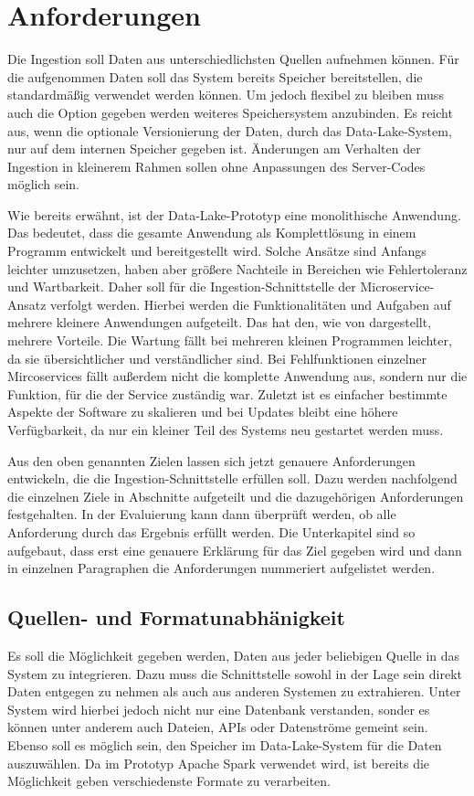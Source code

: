 \chapter{Anforderungen}

Die Ingestion soll Daten aus unterschiedlichsten Quellen aufnehmen können.
Für die aufgenommen Daten soll das System bereits Speicher bereitstellen, die standardmäßig verwendet werden können.
Um jedoch flexibel zu bleiben muss auch die Option gegeben werden weiteres Speichersystem anzubinden.
Es reicht aus, wenn die optionale Versionierung der Daten, durch das Data-Lake-System, nur auf dem internen Speicher gegeben ist.
Änderungen am Verhalten der Ingestion in kleinerem Rahmen sollen ohne Anpassungen des Server-Codes möglich sein.

Wie bereits erwähnt, ist der Data-Lake-Prototyp eine monolithische Anwendung.
Das bedeutet, dass die gesamte Anwendung als Komplettlösung in einem Programm entwickelt und bereitgestellt wird.
Solche Ansätze sind Anfangs leichter umzusetzen, haben aber größere Nachteile in Bereichen wie Fehlertoleranz und Wartbarkeit.
Daher soll für die Ingestion-Schnittstelle der Microservice-Ansatz verfolgt werden.
Hierbei werden die Funktionalitäten und Aufgaben auf mehrere kleinere Anwendungen aufgeteilt.
Das hat den, wie von \textcite{microservices} dargestellt, mehrere Vorteile.
Die Wartung fällt bei mehreren kleinen Programmen leichter, da sie übersichtlicher und verständlicher sind.
Bei Fehlfunktionen einzelner Mircoservices fällt außerdem nicht die komplette Anwendung aus, sondern nur die Funktion, für die der Service zuständig war.
Zuletzt ist es einfacher bestimmte Aspekte der Software zu skalieren und bei Updates bleibt eine höhere Verfügbarkeit, da nur ein kleiner Teil des Systems neu gestartet werden muss.

Aus den oben genannten Zielen lassen sich jetzt genauere Anforderungen entwickeln, die die Ingestion-Schnittstelle erfüllen soll.
Dazu werden nachfolgend die einzelnen Ziele in Abschnitte aufgeteilt und die dazugehörigen Anforderungen festgehalten.
In der Evaluierung kann dann überprüft werden, ob alle Anforderung durch das Ergebnis erfüllt werden.
Die Unterkapitel sind so aufgebaut, dass erst eine genauere Erklärung für das Ziel gegeben wird und dann in einzelnen Paragraphen die Anforderungen nummeriert aufgelistet werden.

\section{Quellen- und Formatunabhänigkeit}
Es soll die Möglichkeit gegeben werden, Daten aus jeder beliebigen Quelle in das System zu integrieren.
Dazu muss die Schnittstelle sowohl in der Lage sein direkt Daten entgegen zu nehmen als auch aus anderen Systemen zu extrahieren.
Unter System wird hierbei jedoch nicht nur eine Datenbank verstanden, sonder es können unter anderem auch Dateien, APIs oder Datenströme gemeint sein.
Ebenso soll es möglich sein, den Speicher im Data-Lake-System für die Daten auszuwählen.
Da im Prototyp Apache Spark verwendet wird, ist bereits die Möglichkeit geben verschiedenste Formate zu verarbeiten.


